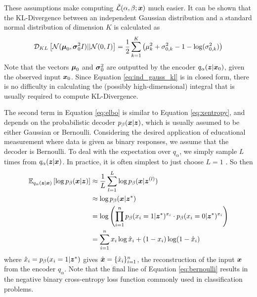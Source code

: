 These assumptions make computing $\tilde{\mathcal{L}}(\alpha,\beta;\boldsymbol{x})$ much easier. It can be shown \cite{doersch2016} that the KL-Divergence between an independent Gaussian distribution and a standard normal distribution of dimension $K$ is calculated as
\begin{equation}
  \mathcal{D}_{KL}\left[ \mathcal{N}(\boldsymbol{\mu}_0, \boldsymbol{\sigma}_0^2I) || \mathcal{N}(0,I) \right] = \frac{1}{2}\sum_{k=1}^K \left( \mu_k^2 + \sigma_{0,k}^2 - 1 - \log(\sigma_{0,k}^2)\right)
  \label{eq:ind_gauss_kl}
\end{equation}
Note that the vectors $\boldsymbol{\mu}_0$ and $\boldsymbol{\sigma}_0^2$ are outputted by the encoder $q_\alpha(\boldsymbol{z} | \boldsymbol{x}_0)$, given the observed input $\boldsymbol{x}_0$. Since Equation \ref{eq:ind_gauss_kl} is in closed form, there is no difficulty in calculating the (possibly high-dimensional) integral that is usually required to compute KL-Divergence.

The second term in Equation \ref{eq:elbo} is similar to Equation \ref{eq:xentropy}, and depends on the probabilistic decoder $p_\beta(\boldsymbol{x} | \boldsymbol{z})$, which is usually assumed to be either Gaussian or Bernoulli. Considering the desired application of educational measurement where data is given as binary responses, we assume that the decoder is Bernoulli. To deal with the expectation over $q_\alpha$, we simply sample $L$ times from $q_\alpha(\boldsymbol{z} | \boldsymbol{x})$. In practice, it is often simplest to just choose $L=1$ \cite{kingma2014}. So then 
\begin{equation}
  \begin{split}
    \mathbb{E}_{q_\alpha(\boldsymbol{z} | \boldsymbol{x})} \left[ \log p_\beta(\boldsymbol{x} | \boldsymbol{z}) \right] &\approx \frac{1}{L}\sum_{l=1}^L \log p_\beta(\boldsymbol{x} | \boldsymbol{z}^{(l)}) \\
    &\approx \log p_\beta(\boldsymbol{x}| \boldsymbol{z}^*) \\
    &= \log\left( \prod_{i=1}^n p_\beta(x_i = 1 | \boldsymbol{z}^*)^{x_i} \cdot p_\beta(x_i=0 | \boldsymbol{z}^*)^{x_i} \right) \\
  &= \sum_{i=1}^n x_i\log \hat x_i + (1-x_i)\log (1-\hat x_i)
  \end{split}
  \label{eq:bernoulli}
\end{equation}
where $\hat x_i = p_\beta(x_i=1 | \boldsymbol{z}^*)$ gives $\hat{\boldsymbol{x}} = \{\hat x_i\}_{i=1}^n$, the reconstruction of the input $\boldsymbol{x}$ from the encoder $q_\alpha$. Note that the final line of Equation \ref{eq:bernoulli} results in the negative binary cross-entropy loss function commonly used in classification problems.

